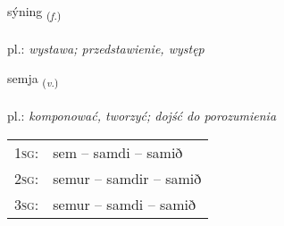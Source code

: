 \documentclass[frontgrid, backgrid]{flacards}\usepackage[]{graphicx}\usepackage[]{xcolor}
\begin{document}
\renewcommand{\flhead}{\vskip5pt \fboxsep=0pt {\small\bfseries\footnotesize Nafnorð | Noun}}
\renewcommand{\fcfoot}{\vskip5pt \fboxsep=0pt \hspace{2pt}{\small\bfseries\footnotesize 1K}}

\renewcommand{\blhead}{\vskip5pt {\small\bfseries\footnotesize Nafnorð | Noun }}
\renewcommand{\bcfoot}{\vskip5pt \hspace{2pt}{\small\bfseries\footnotesize 1K}}


{sýning \small{\textsubscript{(\textit{f.})}} \\[1ex] %
\textphonetic{[siːniŋk]} \\
pl.: \emph{wystawa; przedstawienie, występ} \\  [2ex]
\renewcommand*{\arraystretch}{0.8}
}

\renewcommand{\flhead}{\vskip5pt \fboxsep=0pt {\small\bfseries\footnotesize Sagnorð | Verb}}
\renewcommand{\fcfoot}{\vskip5pt \fboxsep=0pt \hspace{2pt}{\small\bfseries\footnotesize 1K}}

\renewcommand{\blhead}{\vskip5pt {\small\bfseries\footnotesize Sagnorð | Verb }}
\renewcommand{\bcfoot}{\vskip5pt \hspace{2pt}{\small\bfseries\footnotesize 1K}}


{semja \small{\textsubscript{(\textit{v.})}} \\[1ex] %
\textphonetic{[sɛmja]} \\
pl.: \emph{komponować, tworzyć; dojść do porozumienia} \\  [2ex]
\renewcommand*{\arraystretch}{0.8}
\begin{tabular}{p{1cm}l}
\textsc{1sg}: & sem -- samdi -- samið \\ 
\textsc{2sg}: & semur -- samdir -- samið \\ 
\textsc{3sg}: & semur -- samdi -- samið \\ 
\end{tabular}
}
\end{document}
